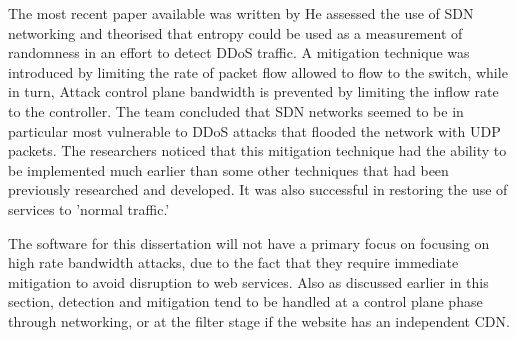 The most recent paper available was written by \citeauthor{ahalawat2019entropy} He assessed the use of SDN networking and theorised that entropy could be used as a measurement of randomness in an effort to detect DDoS traffic. A mitigation technique was introduced by limiting the rate of packet flow allowed to flow to the switch, while in turn, Attack control plane bandwidth is prevented by limiting the inflow rate to the controller. The team concluded that SDN networks seemed to be in particular most vulnerable to DDoS attacks that flooded the network with UDP packets. The researchers noticed that this mitigation technique had the ability to be implemented much earlier than some other techniques that had been previously researched and developed. It was also successful in restoring the use of services to 'normal traffic.' \cite{ahalawat2019entropy}

The software for this dissertation will not have a primary focus on focusing on high rate bandwidth attacks, due to the fact that they require immediate mitigation to avoid disruption to web services. Also as discussed earlier in this section, detection and mitigation tend to be handled at a control plane phase through networking, or at the filter stage if the website has an independent CDN. 
